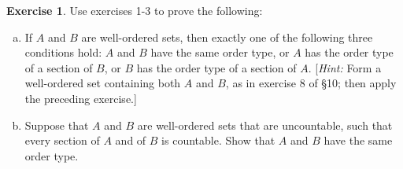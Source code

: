 \documentclass[11pt,a4paper,twoside]{article}
\theoremstyle{definition}
\newcounter{excounter}
\newtheorem{exercise}[excounter]{Exercise}
\begin{document}
\begin{exercise}

  Use exercises 1-3 to prove the following:
  \begin{enumerate}[(a)]

  \item If $A$ and $B$ are well-ordered sets, then exactly one of the following three conditions hold:
    $A$ and $B$ have the same order type, or $A$ has the order type of a section of $B$, or $B$ has the order type
    of a section of $A$. [\emph{Hint:} Form a well-ordered set containing both $A$ and $B$, as in exercise 8 of \S 10;
    then apply the preceding exercise.]

  \item Suppose that $A$ and $B$ are well-ordered sets that are uncountable, such that every section of $A$ and of $B$
    is countable. Show that $A$ and $B$ have the same order type.

  \end{enumerate}

\end{exercise}
\end{document}
